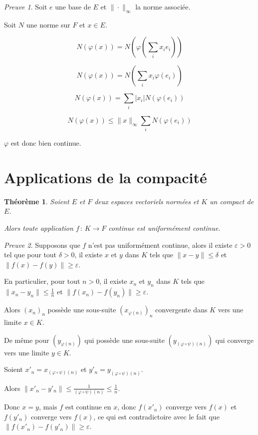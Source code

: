\documentclass[]{article}
\newtheorem{mythm}{Théorème}
\theoremstyle{remark}
\newtheorem{myproof}{Preuve}
\theoremstyle{definition}
\newcommand{\funcshort}[3]{
#1 \, : \, #2 \longrightarrow #3
}
\begin{document}
\begin{myproof}
	Soit $e$ une base de $E$ et $\|\cdot\|_{\infty}$ la norme associée.
	
	Soit $N$ une norme sur $F$ et $x \in E$.
	
	$$N(\varphi(x))=N\left(\varphi \left(\sum_{i} x_i e_i\right)\right)$$

	$$N(\varphi(x))=N\left(\sum_{i} x_i \varphi \left(e_i\right)\right)$$
	
	$$N(\varphi(x))= \sum_{i} |x_i| N\left(\varphi \left(e_i\right)\right)$$
	
	$$N(\varphi(x)) \leqslant \|x\|_{\infty} \sum_i N(\varphi (e_i))$$
	
	$\varphi$ est donc bien continue.
\end{myproof}

\section{Applications de la compacité}

\begin{mythm}
	Soient $E$ et $F$ deux espaces vectoriels normées et $K$ un compact de $E$.
	
	Alors toute application $\funcshort{f}{K}{F}$ continue est uniformément continue.
\end{mythm}

\begin{myproof}
	Supposons que $f$ n'est pas uniformément continue, alors il existe $\varepsilon > 0$ tel que pour tout $\delta > 0$, il existe $x$ et $y$ dans $K$ tels que $\|x-y\| \leqslant \delta$ et $\|f(x) - f(y)\| \geqslant \varepsilon$.
	
	En particulier, pour tout $n > 0$, il existe $x_n$ et $y_n$ dans $K$ tels que $\|x_n-y_n\| \leqslant \frac{1}{n}$ et $\|f(x_n) - f(y_n)\| \geqslant \varepsilon$.
	
	Alors $(x_n)_n$ possède une sous-suite $(x_{\varphi(n)})_n$ convergente dans $K$ vers une limite $x \in K$.
	
	De même pour $(y_{\varphi(n)})$ qui possède une sous-suite $(y_{(\varphi \circ \psi)(n)})$ qui converge vers une limite $y \in K$.
	
	Soient $x'_n = x_{(\varphi \circ \psi)(n)}$ et $y'_n = y_{(\varphi \circ \psi)(n)}$.
	
	Alors $\|x'_n - y'_n\| \leqslant \frac{1}{(\varphi \circ \psi)(n)} \leqslant \frac{1}{n}$.
	
	Donc $x=y$, mais $f$ est continue en $x$, donc $f(x'_n)$ converge vers $f(x)$ et $f(y'_n)$ converge vers $f(x)$, ce qui est contradictoire avec le fait que $\|f(x'_n) - f(y'_n)\| \geqslant \varepsilon$.
\end{myproof}
\end{document}
